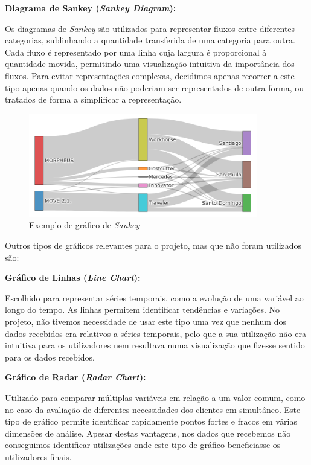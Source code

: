 \textbf{Diagrama de Sankey (\textit{Sankey Diagram}):}

Os diagramas de \textit{Sankey} são utilizados para representar fluxos entre diferentes categorias, sublinhando a quantidade transferida de uma categoria para outra. Cada fluxo é representado por uma linha cuja largura é proporcional à quantidade movida, permitindo uma visualização intuitiva da importância dos fluxos. Para evitar representações complexas, decidimos apenas recorrer a este tipo apenas quando os dados não poderiam ser representados de outra forma, ou tratados de forma a simplificar a representação.

\begin{figure}[H]
    \centering
    \includegraphics[max width=10cm]{./img/skankey}
    \caption{Exemplo de gráfico de \textit{Sankey}}
\end{figure}

Outros tipos de gráficos relevantes para o projeto, mas que não foram utilizados são:

\textbf{Gráfico de Linhas (\textit{Line Chart}):}  

Escolhido para representar séries temporais, como a evolução de uma variável ao longo do tempo. As linhas permitem identificar tendências e variações. No projeto, não tivemos necessidade de usar este tipo uma vez que nenhum dos dados recebidos era relativos a séries temporais, pelo que a sua utilização não era intuitiva para os utilizadores nem resultava numa visualização que fizesse sentido para os dados recebidos.

\textbf{Gráfico de Radar (\textit{Radar Chart}):}  

Utilizado para comparar múltiplas variáveis em relação a um valor comum, como no caso da avaliação de diferentes necessidades dos clientes em simultâneo. Este tipo de gráfico permite identificar rapidamente pontos fortes e fracos em várias dimensões de análise. Apesar destas vantagens, nos dados que recebemos não conseguimos identificar utilizações onde este tipo de gráfico beneficiasse os utilizadores finais.

